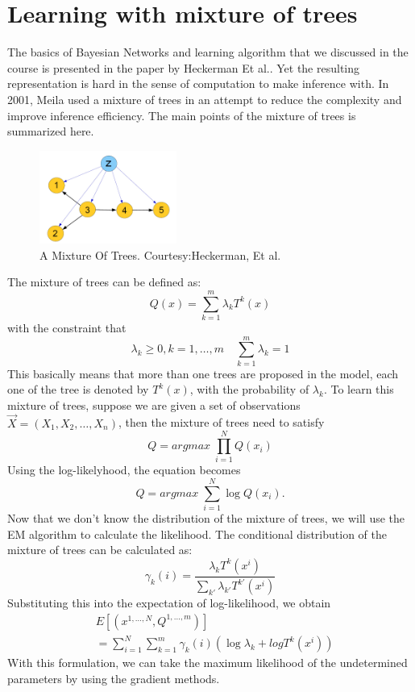 \documentclass[11pt]{article}
\begin{document}
\section{Learning with mixture of trees}
The basics of Bayesian Networks and learning algorithm that we discussed in the course is presented in the paper by Heckerman Et al.\cite{heckerman1995learning}. Yet the resulting representation is hard in the sense of computation to make inference with. In 2001, Meila\cite{meila2001learning} used a mixture of trees in an attempt to reduce the complexity and improve inference efficiency. The main points of the mixture of trees is summarized here. 
\begin{figure}[h!]
	\centering
	\includegraphics[width=0.4\textwidth]{MixtureOfTrees}
	\caption{A Mixture Of Trees. Courtesy:Heckerman, Et al.}
\end{figure}
\noindent The mixture of trees can be defined as:
\begin{equation}
Q(x)=\sum\limits_{k=1}^{m}\lambda_kT^k(x)
\end{equation}
with the constraint that 
\[\lambda_k\geq0,k=1,\ldots,m\quad\sum\limits_{k=1}^{m}\lambda_k=1\]
This basically means that more than one trees are proposed in the model, each one of the tree is denoted by $T^k(x)$, with the probability of $\lambda_k$. 
To learn this mixture of trees, suppose we are given a set of observations $\vec{X}=(X_1,X_2,\ldots,X_n)$, then the mixture of trees need to satisfy
\[Q=argmax\;\prod\limits_{i=1}^{N}Q(x_i)\]
Using the log-likelyhood, the equation becomes
\[Q=argmax\;\sum\limits_{i=1}^{N}\log{Q(x_i)}.\]
Now that we don't know the distribution of the mixture of trees, we will use the EM algorithm to calculate the likelihood. 
The conditional distribution of the mixture of trees can be calculated as:
\[\gamma_k(i)=\dfrac{\lambda_kT^k(x^i)}{\sum_{k'}\lambda_{k'}T^{k'}(x^i)}\]
Substituting this into the expectation of log-likelihood, we obtain
\begin{align*}
& E[(x^{1,\ldots,N},Q^{1,\ldots,m})]\\
& =\sum\limits_{i=1}^{N}\sum\limits_{k=1}^{m}\gamma_k(i)(\log\lambda_k+log{T^k(x^i)})
\end{align*}
With this formulation, we can take the maximum likelihood of the undetermined parameters by using the gradient methods. 
\end{document}
